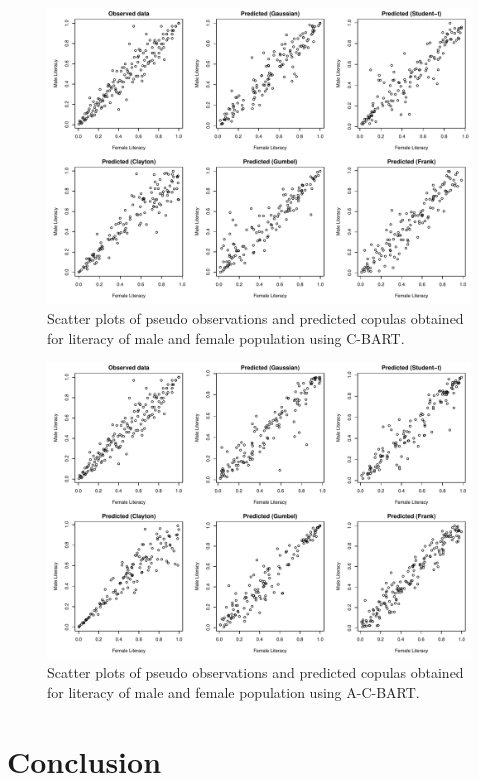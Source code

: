 \documentclass{amsart}
\begin{document}
\begin{figure}
	\centering
	\includegraphics[width = 0.95\linewidth]{"LT_vs_GDP_woa.pdf"}
	\caption{Scatter plots of pseudo observations and predicted copulas obtained for literacy of male and female population using C-BART.}
	\label{fig:pseudo:LT:woa}
\end{figure}

\begin{figure}
	\centering
	\includegraphics[width = 0.95\linewidth]{"LT_vs_GDP_wa.pdf"}
	\caption{Scatter plots of pseudo observations and predicted copulas obtained for literacy of male and female population using A-C-BART.}
	\label{fig:pseudo:LT:wa}
\end{figure}




\section{Conclusion}\label{sec:conc}
\end{document}
